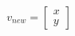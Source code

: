 \documentclass[preview]{standalone}
\begin{document}
\begin{align*}
v_{new} = \begin{bmatrix} x \\ y \end{bmatrix}
\end{align*}
\end{document}
